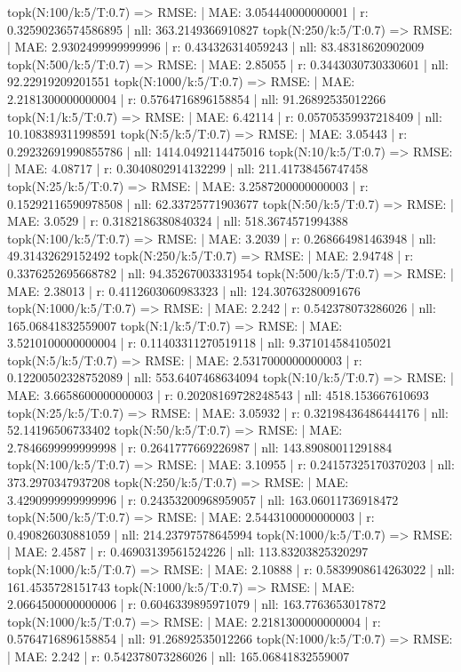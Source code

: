 topk(N:100/k:5/T:0.7) => RMSE: | MAE: 3.054440000000001 | r: 0.32590236574586895 | nll: 363.2149366910827
topk(N:250/k:5/T:0.7) => RMSE: | MAE: 2.9302499999999996 | r: 0.434326314059243 | nll: 83.48318620902009
topk(N:500/k:5/T:0.7) => RMSE: | MAE: 2.85055 | r: 0.3443030730330601 | nll: 92.22919209201551
topk(N:1000/k:5/T:0.7) => RMSE: | MAE: 2.2181300000000004 | r: 0.5764716896158854 | nll: 91.26892535012266
topk(N:1/k:5/T:0.7) => RMSE: | MAE: 6.42114 | r: 0.05705359937218409 | nll: 10.108389311998591
topk(N:5/k:5/T:0.7) => RMSE: | MAE: 3.05443 | r: 0.29232691990855786 | nll: 1414.0492114475016
topk(N:10/k:5/T:0.7) => RMSE: | MAE: 4.08717 | r: 0.3040802914132299 | nll: 211.41738456747458
topk(N:25/k:5/T:0.7) => RMSE: | MAE: 3.2587200000000003 | r: 0.15292116590978508 | nll: 62.33725771903677
topk(N:50/k:5/T:0.7) => RMSE: | MAE: 3.0529 | r: 0.3182186380840324 | nll: 518.3674571994388
topk(N:100/k:5/T:0.7) => RMSE: | MAE: 3.2039 | r: 0.268664981463948 | nll: 49.31432629152492
topk(N:250/k:5/T:0.7) => RMSE: | MAE: 2.94748 | r: 0.3376252695668782 | nll: 94.35267003331954
topk(N:500/k:5/T:0.7) => RMSE: | MAE: 2.38013 | r: 0.4112603060983323 | nll: 124.30763280091676
topk(N:1000/k:5/T:0.7) => RMSE: | MAE: 2.242 | r: 0.542378073286026 | nll: 165.06841832559007
topk(N:1/k:5/T:0.7) => RMSE: | MAE: 3.5210100000000004 | r: 0.11403311270519118 | nll: 9.371014584105021
topk(N:5/k:5/T:0.7) => RMSE: | MAE: 2.5317000000000003 | r: 0.12200502328752089 | nll: 553.6407468634094
topk(N:10/k:5/T:0.7) => RMSE: | MAE: 3.6658600000000003 | r: 0.20208169728248543 | nll: 4518.153667610693
topk(N:25/k:5/T:0.7) => RMSE: | MAE: 3.05932 | r: 0.32198436486444176 | nll: 52.14196506733402
topk(N:50/k:5/T:0.7) => RMSE: | MAE: 2.7846699999999998 | r: 0.2641777669226987 | nll: 143.89080011291884
topk(N:100/k:5/T:0.7) => RMSE: | MAE: 3.10955 | r: 0.24157325170370203 | nll: 373.2970347937208
topk(N:250/k:5/T:0.7) => RMSE: | MAE: 3.4290999999999996 | r: 0.24353200968959057 | nll: 163.06011736918472
topk(N:500/k:5/T:0.7) => RMSE: | MAE: 2.5443100000000003 | r: 0.490826030881059 | nll: 214.23797578645994
topk(N:1000/k:5/T:0.7) => RMSE: | MAE: 2.4587 | r: 0.46903139561524226 | nll: 113.83203825320297
topk(N:1000/k:5/T:0.7) => RMSE: | MAE: 2.10888 | r: 0.5839908614263022 | nll: 161.4535728151743
topk(N:1000/k:5/T:0.7) => RMSE: | MAE: 2.0664500000000006 | r: 0.6046339895971079 | nll: 163.7763653017872
topk(N:1000/k:5/T:0.7) => RMSE: | MAE: 2.2181300000000004 | r: 0.5764716896158854 | nll: 91.26892535012266
topk(N:1000/k:5/T:0.7) => RMSE: | MAE: 2.242 | r: 0.542378073286026 | nll: 165.06841832559007

